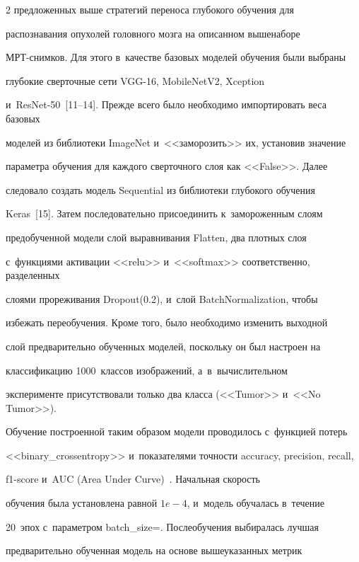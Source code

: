 \begin{multicols}{2}
предложенных выше стратегий переноса глубокого обучения для 

распознавания опухолей головного мозга на описанном выше\linebreak наборе  

МРТ-сним\-ков. Для этого в~качестве базовых моделей обучения были выбраны 

глубокие сверточные сети VGG-16, MobileNetV2, Xception 

и~\mbox{ResNet-50}~[11--14]. Прежде всего было необходимо импортировать веса базовых 

моделей из биб\-лио\-те\-ки ImageNet и~<<заморозить>> их, установив значение 

параметра обучения для каждого сверточного слоя как <<False>>. Далее 

следовало создать модель Sequential из библиотеки глубокого обучения 

Keras~[15]. Затем последовательно присоединить к~замороженным слоям 

предобученной модели слой выравнивания Flatten, два плотных слоя 

с~функциями активации <<relu>> и~<<softmax>> соответственно, разделенных 

слоями прореживания Dropout(0.2), и~слой BatchNormalization, чтобы 

избежать переобучения. Кроме того, было необходимо изменить выходной 

слой предварительно обучен\-ных моделей, поскольку он был настроен на 

классификацию 1000~классов изображений, а~в~вычислительном 

эксперименте присутствовали только два класса (<<Tumor>> и~<<No Tumor>>). 



Обучение построенной таким образом модели проводилось с~функцией потерь 

<<binary\_crossentropy>> и~показателями точности accuracy, precision, recall,  

f1-score и~AUC (Area Under Curve)~\cite{9-shet, 15-shet}. Начальная ско\-рость 

обучения была установлена равной $1e - 4$, и~модель обучалась в~течение 

20~эпох с~параметром batch\_size\;=. После\linebreak обучения выбиралась лучшая 

предварительно обучен\-ная модель на основе вышеуказанных мет\-рик  


\end{multicols}
